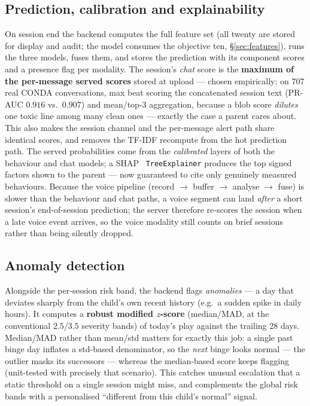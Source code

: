 \documentclass[11pt,a4paper]{article}
\begin{document}
\subsection{Prediction, calibration and explainability}
On session end the backend computes the full feature set (all twenty are stored for
display and audit; the model consumes the objective ten, \S\ref{sec:features}), runs
the three models, fuses them, and stores the prediction with its component scores and
a presence flag per modality. The session's \emph{chat} score is the \textbf{maximum
of the per-message served scores} stored at upload --- chosen empirically: on 707
real CONDA conversations, max beat scoring the concatenated session text (PR-AUC
$0.916$ vs.\ $0.907$) and mean/top-3 aggregation, because a blob score \emph{dilutes}
one toxic line among many clean ones --- exactly the case a parent cares about. This
also makes the session channel and the per-message alert path share identical scores,
and removes the TF-IDF recompute from the hot prediction path. The served probabilities come from the \emph{calibrated}
layers of both the behaviour and chat models; a
SHAP~\cite{shap2017} \texttt{TreeExplainer} produces the top signed factors shown to
the parent --- now guaranteed to cite only genuinely measured behaviours. Because the voice pipeline (record $\rightarrow$ buffer $\rightarrow$
analyse $\rightarrow$ fuse) is slower than the behaviour and chat paths, a voice segment
can land \emph{after} a short session's end-of-session prediction; the server therefore
re-scores the session when a late voice event arrives, so the voice modality still counts
on brief sessions rather than being silently dropped.

\subsection{Anomaly detection}
Alongside the per-session risk band, the backend flags \emph{anomalies} --- a day
that deviates sharply from the child's own recent history (e.g.\ a sudden spike in
daily hours). It computes a \textbf{robust modified $z$-score} (median/MAD, at the
conventional $2.5$/$3.5$ severity bands) of today's play against the trailing 28
days. Median/MAD rather than mean/std matters for exactly this job: a single past
binge day inflates a std-based denominator, so the \emph{next} binge looks normal
--- the outlier masks its successors --- whereas the median-based score keeps
flagging (unit-tested with precisely that scenario). This catches unusual escalation
that a static threshold on a single session might miss, and complements the global
risk bands with a personalised ``different from this child's normal'' signal.
\end{document}
